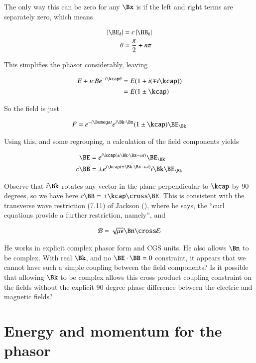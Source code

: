 The only way this can be zero for any $\Bx$ is if the left and right terms are separately zero, which means

\begin{align*}
\Abs{\BE_k} &= c \Abs{\BB_k} \\
\theta &= \frac{\pi}{2} + n \pi
\end{align*}

This simplifies the phasor considerably, leaving

\begin{align*}
E + i c B e^{-i\kcap \theta}
&=
E(1 + i (\mp i\kcap )) \\
&=
E(1 \pm \kcap)
\end{align*}

So the field is just

\begin{align}
F = e^{-i \Bomega t} e^{i \Bk \cdot \Bx} (1 \pm \kcap) \BE_\Bk
\end{align}

Using this, and some regrouping, a calculation of the field components yields

\begin{align}
\BE &= e^{i \kcap( \pm \Bk \cdot \Bx -\omega t )} \BE_\Bk \\
c \BB &= \pm e^{i \kcap( \pm \Bk \cdot \Bx -\omega t )} i \Bk \BE_\Bk
\end{align}

Observe that $i\Bk$ rotates any vector in the plane perpendicular to $\kcap$ by 90 degrees, so we have here $c \BB = \pm \kcap \cross \BE$.  This is consistent with the transverse wave restriction (7.11) of Jackson (\cite{jackson1975cew}), where he says, the ``curl equations provide a further restriction, namely'', and 

\begin{align}\label{eqn:fooX}
\mathcal{B} = \sqrt{\mu\epsilon} \Bn \cross \mathcal{E}
\end{align}

He works in explicit complex phasor form and CGS units.  He also allows $\Bn$ to be complex.  With real $\Bk$, and no $\BE \cdot \BB = 0$ constraint, it appears that we cannot have such a simple coupling between the field components?  Is it possible that allowing $\Bk$ to be complex allows this cross product coupling constraint on the fields without the explicit 90 degree phase difference between the electric and magnetic fields?

\section{Energy and momentum for the phasor}

